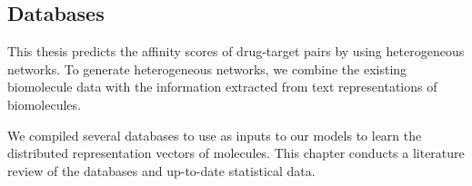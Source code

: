 \subsection{Databases}
\label{chapter:dataset_preparation}

This thesis predicts the affinity scores of drug-target pairs by using heterogeneous networks. To generate heterogeneous networks, we combine the existing biomolecule data with the information extracted from text representations of biomolecules.

We compiled several databases to use as inputs to our models to learn the distributed representation vectors of molecules. This chapter conducts a literature review of the databases and up-to-date statistical data.



